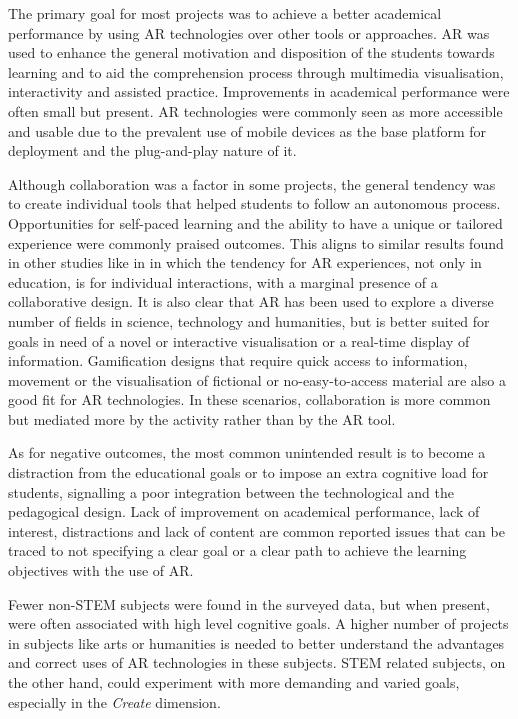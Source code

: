 The primary goal for most projects was to achieve a better academical performance by using \ac{AR} technologies over other tools or approaches. \ac{AR} was used to enhance the general
motivation and disposition of the students towards learning and to aid the comprehension process through multimedia visualisation, interactivity and assisted practice. Improvements in
academical performance were often small but present. \ac{AR} technologies were commonly seen as more accessible and usable due to the prevalent use of mobile devices as the base platform
for deployment and the plug-and-play nature of it.

Although collaboration was a factor in some projects, the general tendency was to create individual tools that helped students to follow an autonomous process. Opportunities for self-paced
learning and the ability to have a unique or tailored experience were commonly praised outcomes. This aligns to similar results found in other studies like in \textcite{dey_2018}
in which the tendency for \ac{AR} experiences, not only in education, is for individual interactions, with a marginal presence of a collaborative design. It is also clear that \ac{AR} has
been used to explore a diverse number of fields in science, technology and humanities, but is better suited for goals in need of a novel or interactive visualisation or a real-time display
of information. Gamification designs that require quick access to information, movement or the visualisation of fictional or no-easy-to-access material are also a good fit for \ac{AR}
technologies. In these scenarios, collaboration is more common but mediated more by the activity rather than by the \ac{AR} tool.

As for negative outcomes, the most common unintended result is to become a distraction from the educational goals or to impose an extra cognitive load for students, signalling a poor
integration between the technological and the pedagogical design. Lack of improvement on academical performance, lack of interest, distractions and lack of content are common reported
issues that can be traced to not specifying a clear goal or a clear path to achieve the learning objectives with the use of \ac{AR}.

Fewer non-STEM subjects were found in the surveyed data, but when present, were often associated with high level cognitive goals. A higher number of projects in subjects like arts or
humanities is needed to better understand the advantages and correct uses of \ac{AR} technologies in these subjects. STEM related subjects, on the other hand, could experiment with more
demanding and varied goals, especially in the \emph{Create} dimension.

